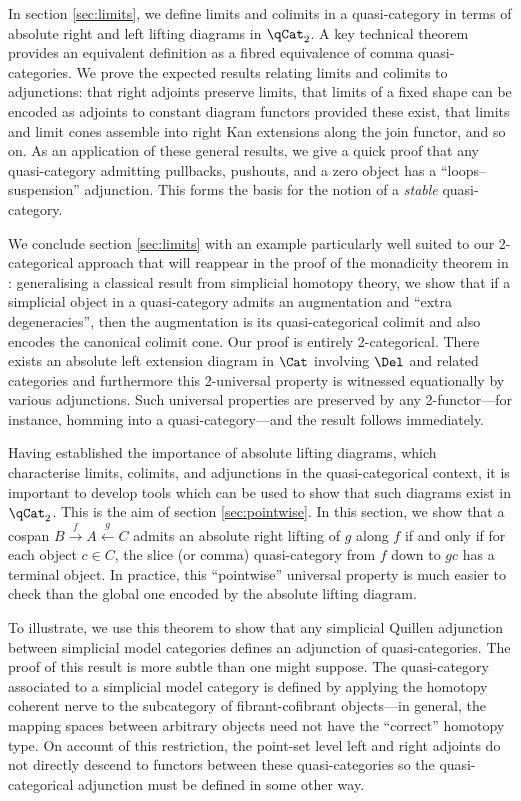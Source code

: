 In section \ref{sec:limits}, we define limits and colimits in a quasi-category in terms of absolute right and left lifting diagrams in $\qCat_2$. A key technical theorem provides an equivalent definition as a fibred equivalence of comma quasi-categories. We prove the expected results relating limits and colimits to adjunctions: that right adjoints preserve limits, that limits of a fixed shape can be encoded as adjoints to constant diagram functors provided these exist, that limits and limit cones assemble into right Kan extensions along the join functor, and so on. As an application of these general results, we give a quick proof that any quasi-category admitting pullbacks, pushouts, and a zero object has a ``loops--suspension'' adjunction. This forms the basis for the notion of a {\em stable\/} quasi-category.

We conclude section \ref{sec:limits} with an example particularly well suited to our 2-categorical approach that will reappear in the proof of the monadicity theorem in \cite{RiehlVerity:2012hc}: generalising a classical result from simplicial homotopy theory, we show that if a simplicial object in a quasi-category admits an augmentation and ``extra degeneracies'', then the augmentation is its quasi-categorical colimit and also encodes the canonical colimit cone. Our proof is entirely 2-categorical. There exists an absolute left extension diagram in $\Cat$ involving $\Del$ and related categories and furthermore this 2-universal property is witnessed equationally by various adjunctions. Such universal properties are preserved by any 2-functor---for instance, homming into a quasi-category---and the result follows immediately.

Having established the importance of absolute lifting diagrams, which characterise limits, colimits, and adjunctions in the quasi-categorical context, it is important to develop tools which can be used to show that such diagrams exist in $\qCat_2$. This is the aim of section \ref{sec:pointwise}. In this section,  we show that a cospan $B \xrightarrow{f} A \xleftarrow{g} C$ admits an absolute right lifting of $g$ along $f$ if and only if for each object $c \in C$, the slice (or comma) quasi-category from $f$ down to $gc$ has a terminal object. In practice, this ``pointwise'' universal property is much easier to check than the global one encoded by the absolute lifting diagram. 

To illustrate, we use this theorem to show that any simplicial Quillen adjunction between simplicial model categories defines an adjunction of quasi-categories. The proof of this result is more subtle than one might suppose. The quasi-category associated to a simplicial model category is defined by applying the homotopy coherent nerve to the subcategory of fibrant-cofibrant objects---in general, the mapping spaces between arbitrary objects need not have the ``correct'' homotopy type. On account of this restriction, the point-set level left and right adjoints do not directly descend to functors between these quasi-categories so the quasi-categorical adjunction must be defined in some other way.

